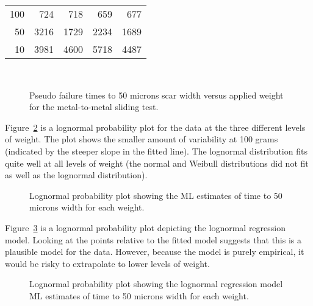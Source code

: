 \begin{example}
\begin{table}
\begin{tabular}{*{5}{r}}
\hline
100 & 724  & 718 &  659  & 677 \\
50  & 3216 & 1729 & 2234 & 1689  \\
10 & 3981 & 4600 & 5718 & 4487  \\
\hline
\end{tabular}\\
\begin{minipage}[t]{4in}
\end{minipage}
\label{table:metal.wear.pseudo.times}
\end{table}
\begin{figure}
\caption{Pseudo failure times to 50 microns scar width
versus applied weight for the
metal-to-metal sliding test.}
\label{figure:etal.wear.altplot.ps}
\end{figure}
Figure~\ref{figure:metal.wear.groupi.lognor.ps} is a lognormal
probability plot for the data at the three different levels of
weight. The plot shows the smaller amount of variability at 100
grams (indicated by the steeper slope in the fitted line). The
lognormal distribution fits quite well at all levels of
weight (the normal and Weibull distributions did not fit as
well as the lognormal distribution).
\begin{figure}
\caption{Lognormal probability plot showing the ML estimates of
time to 50 microns width for each weight.}
\label{figure:metal.wear.groupi.lognor.ps}
\end{figure}
Figure~\ref{figure:metal.wear.groupm.lognor.ps} is a lognormal
probability plot depicting the lognormal regression model.
Looking at the points relative to the fitted model suggests that
this is a plausible model for the data. However, because the model
is purely empirical, it would be risky to extrapolate to lower
levels of weight.
\begin{figure}
\caption{Lognormal probability plot showing the lognormal
regression model ML estimates of time to 50 microns width for each
weight.}
\label{figure:metal.wear.groupm.lognor.ps}
\end{figure}
\end{example}
